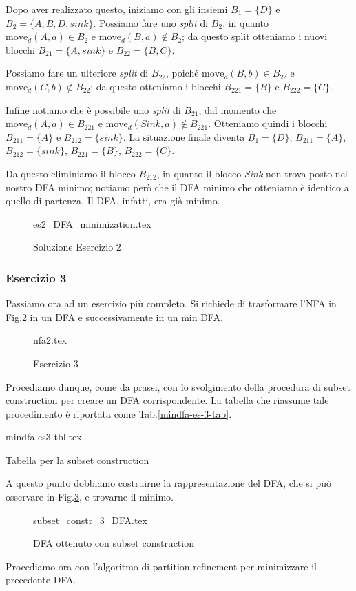 \documentclass[class=book, crop=false, oneside, 12pt]{standalone}
\begin{document}
Dopo aver realizzato questo, iniziamo con gli insiemi \(B_{1}=\{D\}\) e \(B_{2}=\{A,B,D,sink\}\). Possiamo fare uno \emph{split} di \(B_{2}\), in quanto \(\textrm{move}_{d}(A,a) \in B_{2} \) e \(\textrm{move}_{d}(B,a) \notin B_{2} \); da questo split otteniamo i nuovi blocchi \(B_{21}=\{A,sink\}\) e \(B_{22}=\{B,C\}\).

Possiamo fare un ulteriore \emph{split} di \(B_{22}\), poiché \(\textrm{move}_{d}(B,b) \in B_{22} \) e \(\textrm{move}_{d}(C,b) \notin B_{22} \); da questo otteniamo i blocchi \(B_{221}=\{B\}\) e \(B_{222}=\{C\}\).

Infine notiamo che è possibile uno \emph{split} di \(B_{21}\), dal momento che \(\textrm{move}_{d}(A,a) \in B_{221} \) e \(\textrm{move}_{d}(Sink,a) \notin B_{221} \). Otteniamo quindi i blocchi \(B_{211}=\{A\}\) e \(B_{212}=\{sink\}\).
La situazione finale diventa \(B_{1}=\{D\}\), \(B_{211}=\{A\}\), \(B_{212}=\{sink\}\), \(B_{221}=\{B\}\), \(B_{222}=\{C\}\).

Da questo eliminiamo il blocco \(B_{212}\), in quanto il blocco \emph{Sink} non trova posto nel nostro DFA minimo; notiamo però che il DFA minimo che otteniamo è identico a quello di partenza. Il DFA, infatti, era già minimo.  

\begin{figure}[H]
	\centering
    {es2_DFA_minimization.tex}
	\caption{Soluzione Esercizio 2}
  \label{mindfa-es-2-sol}
\end{figure}

\subsubsection{Esercizio 3}
Passiamo ora ad un esercizio più completo. Si richiede di trasformare l'NFA in Fig.\ref{mindfa-es-3} in un DFA e successivamente in un min DFA.
\begin{figure}[H]
	\centering
  {nfa2.tex}
	\caption{Esercizio 3}
	\label{mindfa-es-3}
\end{figure}
Procediamo dunque, come da prassi, con lo svolgimento della procedura di subset construction per creare un DFA corrispondente. La tabella che riassume tale procedimento è riportata come Tab.\ref{mindfa-es-3-tab}.
\begin{table}[H]
	\centering
	{mindfa-es3-tbl.tex}
	\caption{Tabella per la subset construction}
	\label{mindfa-es-3-tab}
\end{table}
A questo punto dobbiamo costruirne la rappresentazione del DFA, che si può osservare in Fig.\ref{dfa-sc-es-3-mindfa}, e trovarne il minimo.
\begin{figure}
	\centering
    {subset_constr_3_DFA.tex}
	\caption{DFA ottenuto con subset construction}
	\label{dfa-sc-es-3-mindfa}
\end{figure}
Procediamo ora con l’algoritmo di partition refinement per minimizzare il precedente DFA.
\end{document}
